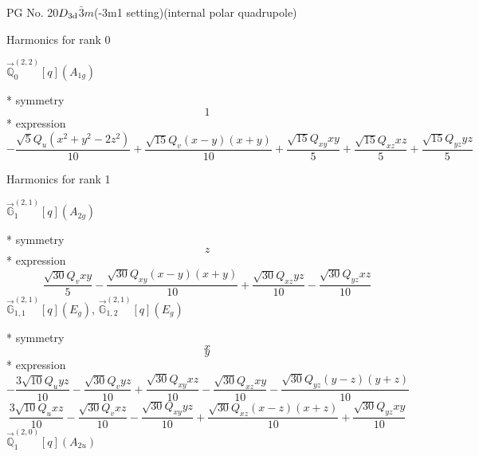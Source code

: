 \documentclass[fleqn,8pt]{jsarticle}
\begin{document}
\setcounter{MaxMatrixCols}{32}

\renewcommand{\tablename}{Table~}
\renewcommand{\figurename}{Figure~}
\begin{center}
\LARGE
PG No. 20\quad$D_{\rm 3d}$\quad$\bar{3}m$\quad(-3m1 setting)\quad[ trigonal ] (internal polar quadrupole)
\end{center}

\noindent * Harmonics for rank 0

\noindent\quad $\vec{\mathbb{Q}}_{0}^{(2,2)}[q](A_{1g})$

\noindent\quad ** symmetry
\begin{dmath*}
1
\end{dmath*}
\noindent\quad ** expression
\begin{dmath*}
- \frac{\sqrt{5} Q_{u} \left(x^{2} + y^{2} - 2 z^{2}\right)}{10} + \frac{\sqrt{15} Q_{v} \left(x - y\right) \left(x + y\right)}{10} + \frac{\sqrt{15} Q_{xy} x y}{5} + \frac{\sqrt{15} Q_{xz} x z}{5} + \frac{\sqrt{15} Q_{yz} y z}{5}
\end{dmath*}

\noindent * Harmonics for rank 1

\noindent\quad $\vec{\mathbb{G}}_{1}^{(2,1)}[q](A_{2g})$

\noindent\quad ** symmetry
\begin{dmath*}
z
\end{dmath*}
\noindent\quad ** expression
\begin{dmath*}
\frac{\sqrt{30} Q_{v} x y}{5} - \frac{\sqrt{30} Q_{xy} \left(x - y\right) \left(x + y\right)}{10} + \frac{\sqrt{30} Q_{xz} y z}{10} - \frac{\sqrt{30} Q_{yz} x z}{10}
\end{dmath*}
\noindent\quad $\vec{\mathbb{G}}_{1,1}^{(2,1)}[q](E_{g})$, $\vec{\mathbb{G}}_{1,2}^{(2,1)}[q](E_{g})$

\noindent\quad ** symmetry
\begin{dmath*}
x
\end{dmath*}
\begin{dmath*}
y
\end{dmath*}
\noindent\quad ** expression
\begin{dmath*}
- \frac{3 \sqrt{10} Q_{u} y z}{10} - \frac{\sqrt{30} Q_{v} y z}{10} + \frac{\sqrt{30} Q_{xy} x z}{10} - \frac{\sqrt{30} Q_{xz} x y}{10} - \frac{\sqrt{30} Q_{yz} \left(y - z\right) \left(y + z\right)}{10}
\end{dmath*}
\begin{dmath*}
\frac{3 \sqrt{10} Q_{u} x z}{10} - \frac{\sqrt{30} Q_{v} x z}{10} - \frac{\sqrt{30} Q_{xy} y z}{10} + \frac{\sqrt{30} Q_{xz} \left(x - z\right) \left(x + z\right)}{10} + \frac{\sqrt{30} Q_{yz} x y}{10}
\end{dmath*}
\noindent\quad $\vec{\mathbb{Q}}_{1}^{(2,0)}[q](A_{2u})$
\end{document}
